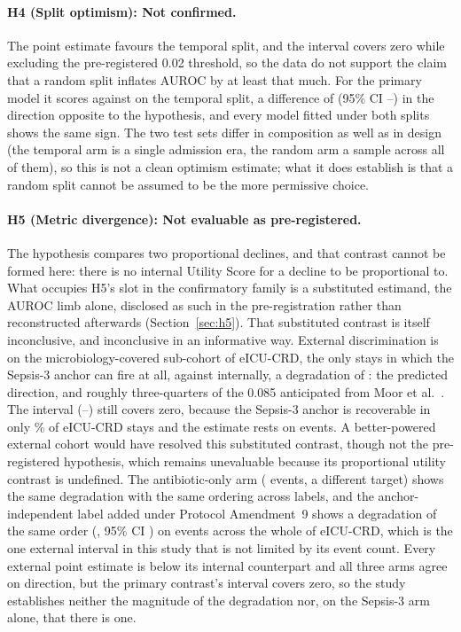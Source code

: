 \paragraph{H4 (Split optimism): Not confirmed.}
The point estimate favours the temporal split, and the interval covers zero
while excluding the pre-registered 0.02 threshold, so the data do not support
the claim that a random split inflates AUROC by at least that much. For the primary model it scores
\pcAurocRandomPrimaryB{} against \pcAurocPrimaryB{} on the temporal split, a
difference of \pcHFourEst{} (95\% CI \pcHFourCiLo--\pcHFourCiHi) in the
direction opposite to the hypothesis, and every model fitted under both splits
shows the same sign. The two test sets differ in composition as well as in
design (the temporal arm is a single admission era, the random arm a sample
across all of them), so this is not a clean optimism estimate; what it does
establish is that a random split cannot be assumed to be the more permissive
choice.

\paragraph{H5 (Metric divergence): Not evaluable as pre-registered.}
The hypothesis compares two proportional declines, and that contrast cannot be
formed here: there is no internal Utility Score for a decline to be
proportional to. What occupies H5's slot in the confirmatory family is a
substituted estimand, the AUROC limb alone, disclosed as such in the
pre-registration rather than reconstructed afterwards
(Section~\ref{sec:h5}). That substituted contrast is itself inconclusive, and
inconclusive in an informative way. External discrimination is
\pcExtAurocPrimaryB{} on the microbiology-covered sub-cohort of eICU-CRD,
the only stays in which the Sepsis-3 anchor can fire at all,
against \pcAurocPrimaryB{} internally, a degradation of \pcHFiveEst{}: the
predicted direction, and roughly three-quarters of the 0.085 anticipated from
Moor et al.\ \cite{moor2023review}. The interval (\pcHFiveCiLo--\pcHFiveCiHi)
still covers zero, because the Sepsis-3 anchor is recoverable in only
\pcExtMicroCoverage\% of eICU-CRD stays and the estimate rests on
\pcExtNEventsB{} events. A better-powered external cohort would have resolved
this substituted contrast, though not the pre-registered hypothesis, which
remains unevaluable because its proportional utility contrast is undefined. The antibiotic-only arm (\pcExtAbxNEventsB{}
events, a different target) shows the same degradation with the same ordering
across labels, and the anchor-independent label added under Protocol
Amendment~9 shows a degradation of the same order
(\pcExtAltDropPrimary, 95\% CI \pcExtAltDropCiPrimary) on
\pcExtAltNEvents{} events across the whole of eICU-CRD, which is the one
external interval in this study that is not limited by its event count. Every external point estimate is below its
internal counterpart and all three arms agree on direction, but the primary contrast's interval covers
zero, so the study establishes neither the magnitude of the degradation nor,
on the Sepsis-3 arm alone, that there is one.

